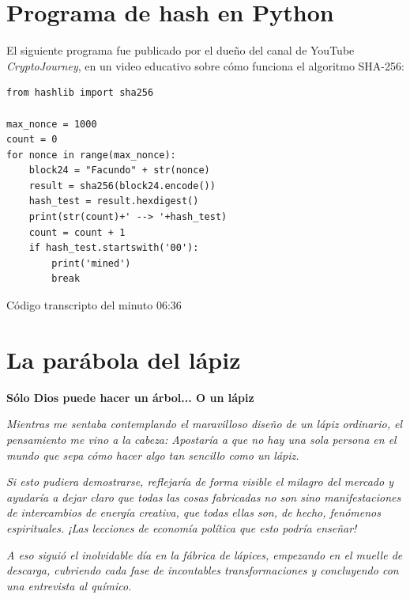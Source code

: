 \documentclass[12pt,a4paper,twoside]{book}
\begin{document}
\chapter{Programa de hash en Python}
El siguiente programa fue publicado por el dueño del canal de YouTube \textit{CryptoJourney}, en un video educativo sobre cómo funciona el algoritmo SHA-256:

\lstset{language=Python, firstnumber=auto, showstringspaces=false, numbers=left}
\begin{lstlisting}
from hashlib import sha256

max_nonce = 1000
count = 0
for nonce in range(max_nonce):
    block24 = "Facundo" + str(nonce)
    result = sha256(block24.encode())
    hash_test = result.hexdigest()
    print(str(count)+' --> '+hash_test)
    count = count + 1
    if hash_test.startswith('00'):
        print('mined')
        break
\end{lstlisting}

\begin{flushright}
Código transcripto del minuto 06:36 \cite{cryptojourney}
\end{flushright}

\chapter{La parábola del lápiz}

\begin{center}
{\Large \textbf{Sólo Dios puede hacer un árbol... O un lápiz}}
\end{center}

\begin{flushright}
\cite{read:lapiz}
\end{flushright}

\vspace{2cm}

\textit{Mientras me sentaba contemplando el maravilloso diseño de un lápiz ordinario, el pensamiento me vino a la cabeza: Apostaría a que no hay una sola persona en el mundo que sepa cómo hacer algo tan sencillo como un lápiz.}

\textit{Si esto pudiera demostrarse, reflejaría de forma visible el milagro del mercado y ayudaría a dejar claro que todas las cosas fabricadas no son sino manifestaciones de intercambios de energía creativa, que todas ellas son, de hecho, fenómenos espirituales. ¡Las lecciones de economía política que esto podría enseñar!}

\textit{A eso siguió el inolvidable día en la fábrica de lápices, empezando en el muelle de descarga, cubriendo cada fase de incontables transformaciones y concluyendo con una entrevista al químico.}
\end{document}
